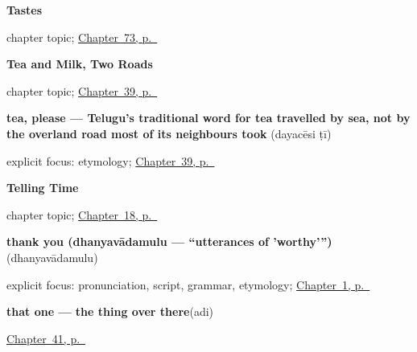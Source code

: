 \noindent\begin{minipage}[t]{\linewidth}
\raggedright
\textbf{Tastes}\par
\footnotesize chapter topic; \hyperref[ch:te-tastes]{Chapter~73, p.~\pageref*{ch:te-tastes}}
\end{minipage}\par\smallskip

\noindent\begin{minipage}[t]{\linewidth}
\raggedright
\textbf{Tea and Milk, Two Roads}\par
\footnotesize chapter topic; \hyperref[ch:te-tea-and-milk]{Chapter~39, p.~\pageref*{ch:te-tea-and-milk}}
\end{minipage}\par\smallskip

\noindent\begin{minipage}[t]{\linewidth}
\raggedright
\textbf{tea, please — Telugu's traditional word for tea travelled by sea, not by the overland road most of its neighbours took}\enspace\emph{ }\enspace(dayacēsi ṭī)\par
\footnotesize explicit focus: etymology; \hyperref[ch:te-tea-and-milk]{Chapter~39, p.~\pageref*{ch:te-tea-and-milk}}
\end{minipage}\par\smallskip

\noindent\begin{minipage}[t]{\linewidth}
\raggedright
\textbf{Telling Time}\par
\footnotesize chapter topic; \hyperref[ch:te-telling-time]{Chapter~18, p.~\pageref*{ch:te-telling-time}}
\end{minipage}\par\smallskip

\noindent\begin{minipage}[t]{\linewidth}
\raggedright
\textbf{thank you (dhanyavādamulu — \textquotedblleft{}utterances of 'worthy'\textquotedblright{})}\enspace\emph{}\enspace(dhanyavādamulu)\par
\footnotesize explicit focus: pronunciation, script, grammar, etymology; \hyperref[ch:greetings]{Chapter~1, p.~\pageref*{ch:greetings}}
\end{minipage}\par\smallskip

\noindent\begin{minipage}[t]{\linewidth}
\raggedright
\textbf{that one — the thing over there}\enspace\emph{}\enspace(adi)\par
\footnotesize \hyperref[ch:te-pointing-and-asking]{Chapter~41, p.~\pageref*{ch:te-pointing-and-asking}}
\end{minipage}\par\smallskip

